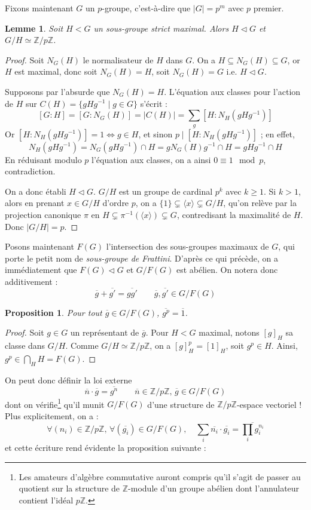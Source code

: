 \documentclass[a4paper, 11pt]{article}
\def\Z{\mathbb{Z}}
\newtheorem*{proposition}{Proposition}
\newtheorem*{lemma}{Lemme}
\begin{document}
Fixons maintenant $G$ un $p$-groupe, c'est-à-dire que $|G| = p^m$ avec $p$
premier.

\begin{lemma}
  Soit $H < G$ un sous-groupe strict \emph{maximal}. Alors $H \triangleleft G$
  et $G/H \simeq \Z/p\Z$.
\end{lemma}
\begin{proof}
  Soit $N_G(H)$ le normalisateur de $H$ dans $G$. On a $H \subseteq N_G(H)
  \subseteq G$, or $H$ est maximal, donc soit $N_G(H) = H$, soit $N_G(H) = G$
  i.e. $H \triangleleft G$.

  Supposons par l'absurde que $N_G(H) = H$. L'équation aux classes pour l'action
  de $H$ sur $C(H) = \{gHg^{-1} \mid g \in G\}$ s'écrit :
  \[ [G : H] = [G : N_G(H)] = |C(H)| = \sum_g [H : N_H(gHg^{-1})] \]
  Or $[H : N_H(gHg^{-1})] = 1 \Leftrightarrow g \in H$, et sinon $p \mid [H :
  N_H(gHg^{-1})]$ ; en effet,
  \[ N_H(gHg^{-1}) = N_G(gHg^{-1}) \cap H = g N_G(H) g^{-1} \cap H = gHg^{-1}
  \cap H \]
  En réduisant modulo $p$ l'équation aux classes, on a ainsi $0 \equiv 1 \mod
  p$, contradiction.

  On a donc établi $H \triangleleft G$. $G/H$ est un groupe de cardinal $p^k$
  avec $k \geq 1$. Si $k > 1$, alors en prenant $x \in G/H$ d'ordre $p$, on a
  $\{1\} \subsetneq \langle x \rangle \subsetneq G/H$, qu'on relève par la
  projection canonique $\pi$ en $H \subsetneq \pi^{-1}(\langle x \rangle)
  \subsetneq G$, contredisant la maximalité de $H$. Donc $|G/H| = p$.
\end{proof}

Posons maintenant $F(G)$ l'intersection des sous-groupes maximaux de $G$,
qui porte le petit nom de \emph{sous-groupe de Frattini}.
D'après ce qui précède, on a immédiatement que $F(G) \triangleleft G$ et
$G/F(G)$ est abélien. On notera donc additivement :
\[ \overline{g} + \overline{g'} = \overline{gg'} \qquad
   \overline{g},\overline{g'} \in G/F(G) \]

\begin{proposition}
  Pour tout $\overline{g} \in G/F(G)$, $\overline{g^p} = \overline{1}$.
\end{proposition}
\begin{proof}
  Soit $g \in G$ un représentant de $\overline{g}$. Pour $H < G$ maximal, notons
  $[g]_H$ sa classe dans $G/H$. Comme $G/H \simeq \Z/p\Z$, on a $[g]_H^p =
  [1]_H$, soit $g^p \in H$. Ainsi, $g^p \in \bigcap_H H = F(G)$.
\end{proof}

On peut donc définir la loi externe
\[ \overline{n} \cdot \overline{g} = \overline{g^n} \qquad
  \overline{n} \in \Z/p\Z,\, \overline{g} \in G/F(G)
\]
dont on vérifie\footnote{Les amateurs d'algèbre commutative auront compris qu'il
  s'agit de passer au quotient sur la structure de $\Z$-module d'un groupe
  abélien dont l'annulateur contient l'idéal $p\Z$.} qu'il munit $G/F(G)$ d'une
structure de $\Z/p\Z$-espace vectoriel ! Plus explicitement, on a :
\[ \forall (n_i) \in \Z/p\Z,\, \forall (\overline{g_i}) \in G/F(G), \quad
  \sum_i \overline{n_i} \cdot \overline{g_i} = \overline{\prod_i g_i^{n_i}} \]
et cette écriture rend évidente la proposition suivante :
\end{document}

